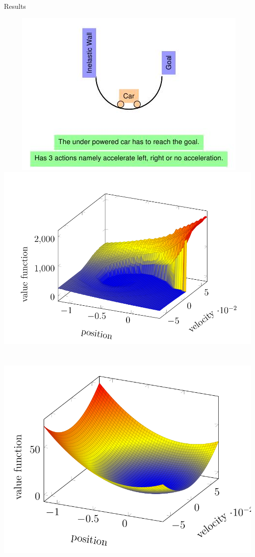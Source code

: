 \documentclass[10pt]{beamer}
\begin{document}
\begin{frame}{Results}
\begin{block}{}
$\mbox{ }$
$\mbox{ }$$\mbox{ }$
\includegraphics[scale=0.29]{mcarpic.jpeg}
$\mbox{ }$
\includegraphics[scale=0.21]{actval.jpeg}\\
$\mbox{ }$\\
$\mbox{ }$
\includegraphics[scale=0.21]{basisval.jpeg}
$$
\end{block}
\end{frame}
\end{document}

